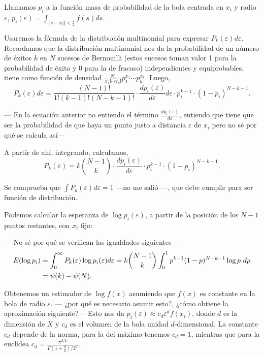 \documentclass[10pt,a4paper]{article} %
\let\mathbb\relax
\theoremstyle{definition}
\begin{document}
Llamamos $p_i$ a la función masa de probabilidad  de la bola centrada en $x_i$ y radio $\varepsilon$, $p_i(\varepsilon) = \int_{\Vert s - x_i \Vert < \frac{\varepsilon}{2}}f(s)ds$. 

Usaremos la fórmula de la distribución multinomial para expresar $P_k(\varepsilon)d\varepsilon$. Recordamos que la distribución multinomial nos da la probabilidad de un número de éxitos $k$ en $N$ sucesos de Bernouilli (estos sucesos toman valor 1 para la probabilidad de éxito  y 0 para la de fracaso) independientes y equiprobables, tiene como función de densidad $\frac{N!}{x_1!\cdots x_k!}p_1^{x_1}\cdots p_k^{x_k}$. Luego,\[
P_k(\varepsilon)d\varepsilon = \frac{(N-1)!}{1!(k-1)!(N-k-1)!} \cdot \frac{d p_i(\varepsilon)}{d\varepsilon} d\varepsilon \cdot p_i^{k-1} \cdot (1-p_i)^{N-k-1}.
\]

--- En la ecuación anterior no entiendo el término $ \frac{d p_i(\varepsilon)}{d\varepsilon} $, entiendo que tiene que ser la probabilidad de que haya un punto justo a distancia $\varepsilon$ de $x_i$ pero no sé por qué se calcula así---

A partir de ahí, integrando, calculamos,\[
P_k(\varepsilon) = k\binom{N-1}{k}
\cdot \frac{d p_i(\varepsilon)}{d\varepsilon} \cdot p_i^{k-1} \cdot (1-p_i)^{N-k-1}.
\]

Se comprueba que $\int P_k(\varepsilon)d\varepsilon = 1$ ---no me salió ---, que debe cumplir para ser función de distribución.

Podemos calcular la esperanza de $\log p_i (\varepsilon)$, a partir de la posición de los $N-1$ puntos restantes, con $x_i$ fijo:

--- No sé por qué se verifican las igualdades siguientes---
\begin{align*}
\mathbb{E}(\log p_i) &= \int_0^\infty P_k(\varepsilon) \log p_i(\varepsilon) d\varepsilon =  k\binom{N-1}{k} \int_0^1 p^{k-1}(1-p)^{N-k-1}\log p\ dp\\ &= \psi (k) - \psi(N).
\end{align*}

Obtenemos un estimador de $\log f(x)$ asumiendo que $f(x)$ es constante en la bola de radio $\varepsilon$. --- ¿por qué es necesario asumir esto?, ¿cómo obtiene la aproximación siguiente?--- Esto nos da $p_i (\varepsilon) \approx c_d \varepsilon^d f(x_i)$, donde $d$ es la dimensión de $X$ y $c_d$ es el volumen de la bola unidad $d$-dimensional. La constante $c_d$ depende de la norma, para la del máximo tenemos $c_d=1$, mientras que para la euclídea $c_d=\frac{\pi^{d/2}}{\Gamma\left ( 1+ \frac{d}{2} \right ) / 2^d}$.
\end{document}
